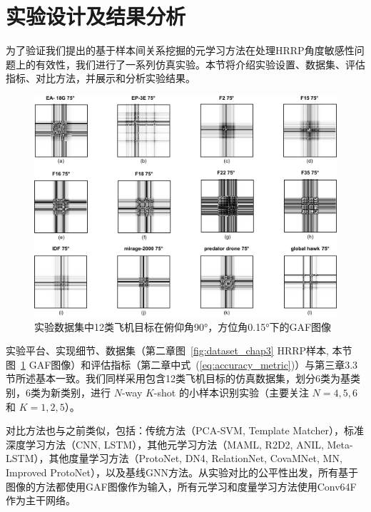 \section{实验设计及结果分析}
\label{sec:experiments_angle}

为了验证我们提出的基于样本间关系挖掘的元学习方法在处理HRRP角度敏感性问题上的有效性，我们进行了一系列仿真实验。本节将介绍实验设置、数据集、评估指标、对比方法，并展示和分析实验结果。


\begin{figure}[!h]
\centering
\includegraphics[width=0.75\linewidth]{figures/gaf_samples.pdf}
\caption{实验数据集中12类飞机目标在俯仰角90°，方位角0.15°下的GAF图像}
\label{fig:gaf_samples}
\end{figure}

实验平台、实现细节、数据集（第二章图~\ref{fig:dataset_chap3} HRRP样本, 本节图~\ref{fig:gaf_samples} GAF图像）和评估指标（第二章中式~(\ref{eq:accuracy_metric})）与第三章3.3节所述基本一致。我们同样采用包含12类飞机目标的仿真数据集，划分6类为基类别，6类为新类别，进行 $N$-way $K$-shot 的小样本识别实验（主要关注 $N=4, 5, 6$ 和 $K=1, 2, 5$）。

对比方法也与之前类似，包括：传统方法（PCA-SVM, Template Matcher），标准深度学习方法（CNN, LSTM），其他元学习方法（MAML, R2D2, ANIL, Meta-LSTM），其他度量学习方法（ProtoNet, DN4, RelationNet, CovaMNet, MN, Improved ProtoNet），以及基线GNN方法。从实验对比的公平性出发，所有基于图像的方法都使用GAF图像作为输入，所有元学习和度量学习方法使用Conv64F作为主干网络。

